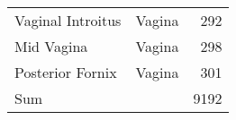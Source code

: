 \begin{table}[htb]
{\begin{center}
\begin{tabular}{llr}
        Vaginal Introitus               & Vagina            & 292   \\
        Mid Vagina                      & Vagina            & 298   \\
        Posterior Fornix                & Vagina            & 301   \\
        Sum                             &                   & 9192  \\
        \bottomrule
    \end{tabular}
    \end{center}
}
\end{table}




